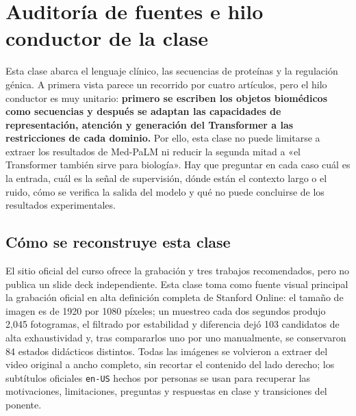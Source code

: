 \section{Auditoría de fuentes e hilo conductor de la clase}

Esta clase abarca el lenguaje clínico, las secuencias de proteínas y la regulación génica. A primera vista parece un recorrido por cuatro artículos, pero el hilo conductor es muy unitario: \textbf{primero se escriben los objetos biomédicos como secuencias y después se adaptan las capacidades de representación, atención y generación del Transformer a las restricciones de cada dominio.} Por ello, esta clase no puede limitarse a extraer los resultados de Med-PaLM ni reducir la segunda mitad a «el Transformer también sirve para biología». Hay que preguntar en cada caso cuál es la entrada, cuál es la señal de supervisión, dónde están el contexto largo o el ruido, cómo se verifica la salida del modelo y qué no puede concluirse de los resultados experimentales.

\subsection{Cómo se reconstruye esta clase}

El sitio oficial del curso ofrece la grabación y tres trabajos recomendados, pero no publica un slide deck independiente. Esta clase toma como fuente visual principal la grabación oficial en alta definición completa de Stanford Online: el tamaño de imagen es de 1920 por 1080 píxeles; un muestreo cada dos segundos produjo 2,045 fotogramas, el filtrado por estabilidad y diferencia dejó 103 candidatos de alta exhaustividad y, tras compararlos uno por uno manualmente, se conservaron 84 estados didácticos distintos. Todas las imágenes se volvieron a extraer del video original a ancho completo, sin recortar el contenido del lado derecho; los subtítulos oficiales \texttt{en-US} hechos por personas se usan para recuperar las motivaciones, limitaciones, preguntas y respuestas en clase y transiciones del ponente.

